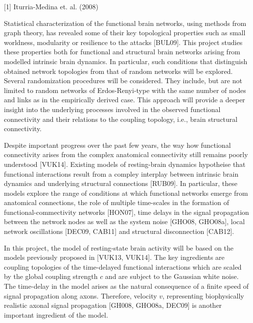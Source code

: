 [1] Iturria-Medina et. al. (2008)

Statistical characterization of the functional brain networks, using methods from graph theory, has revealed some of their key topological properties such as small worldness, modularity or resilience to the attacks [BUL09]. This project studies these properties both for functional and structural brain networks arising from modelled intrinsic brain dynamics. In particular, such conditions that distinguish obtained network topologies from that of random networks will be explored. Several randomization procedures will be considered. They include, but are not limited to random networks of Erdos-Renyi-type with the same number of nodes and links as in the empirically derived case. This approach will provide a deeper insight into the underlying processes involved in the observed functional connectivity and their relations to the coupling topology, i.e., brain structural connectivity.

 
Despite important progress over the past few years, the way how functional connectivity arises from the complex anatomical connectivity still remains poorly understood [VUK14]. Existing models of resting-brain dynamics hypotheise that functional interactions result from a compley interplay between intrinsic brain dynamics and underlying structural connections [RUB09]. In particular, these models explore the range of conditions at which functional networks emerge from anatomical connections, the role of multiple time-scales in the formation of functional-commectivity networks [HON07], time delays in the signal propagation between the network nodes as well as the system noise [GHO08, GHO08a], local network oscillations [DEC09, CAB11] and structural disconnection [CAB12].

In this project, the model of resting-state brain activity will be based on the models previously proposed in [VUK13, VUK14]. The key ingredients are coupling topologies of the time-delayed functional interactions which are scaled by the global coupling strength $c$ and  are subject to the Gaussian white noise. The time-delay in the model arises as the natural consequence of a finite speed of signal propagation along axons. Therefore, velocity $v$, representing biophysically realistic axonal signal propagation [GH008, GHO08a, DEC09] is another important ingredient of the model. 

